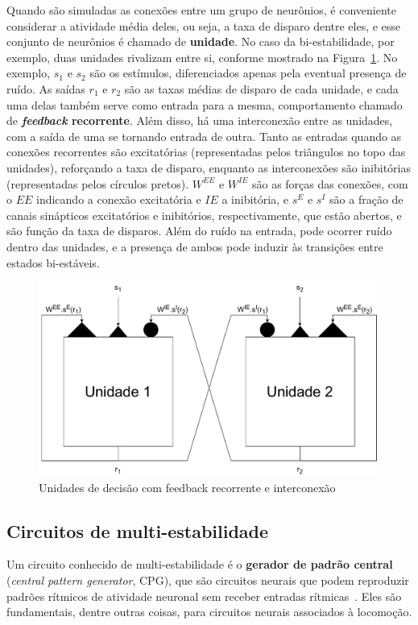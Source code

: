 Quando são simuladas as conexões entre um grupo de neurônios, é conveniente considerar a atividade média deles, ou seja, a taxa de disparo dentre eles, e esse conjunto de neurônios é chamado de \textbf{unidade}. No caso da bi-estabilidade, por exemplo, duas unidades rivalizam entre si, conforme mostrado na Figura~\ref{fig:unidadesdecisao}. No exemplo, $s_1$ e $s_2$ são os estímulos, diferenciados apenas pela eventual presença de ruído. As saídas $r_1$ e $r_2$ são as taxas médias de disparo de cada unidade, e cada uma delas também serve como entrada para a mesma, comportamento chamado de \textbf{\textit{feedback} recorrente}. Além disso, há uma interconexão entre as unidades, com a saída de uma se tornando entrada de outra. Tanto as entradas quando as conexões recorrentes são excitatórias (representadas pelos triângulos no topo das unidades), reforçando a taxa de disparo, enquanto as interconexões são inibitórias (representadas pelos círculos pretos). $W^{EE}$ e $W^{IE}$ são as forças das conexões, com o $EE$ indicando a conexão excitatória e $IE$ a inibitória, e $s^E$ e $s^I$ são a fração de canais sinápticos excitatórios e inibitórios, respectivamente, que estão abertos, e são função da taxa de disparos. Além do ruído na entrada, pode ocorrer ruído dentro das unidades, e a presença de ambos pode induzir às transições entre estados bi-estáveis.


\begin{figure}[tb]
	\centering
	\caption[Unidades de decisão com feedback recorrente e interconexão]{Unidades de decisão com feedback recorrente e interconexão}
	\label{fig:unidadesdecisao}
	\includegraphics[width=0.7\linewidth]{figs/unidades_decisao}
\end{figure}

\subsection{Circuitos de multi-estabilidade}
Um circuito conhecido de multi-estabilidade é o \textbf{gerador de padrão central} (\textit{central pattern generator}, CPG), que são circuitos neurais que podem reproduzir padrões rítmicos de atividade neuronal sem receber entradas rítmicas~\cite{ijspeert_central_2008}. Eles são fundamentais, dentre outras coisas, para circuitos neurais associados à locomoção.

